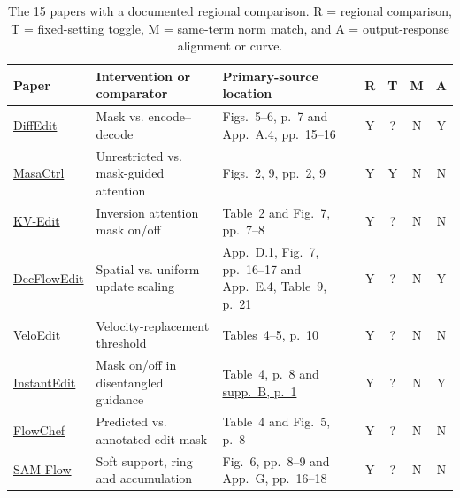 \begin{table}[t]\centering\small
\caption{The 15 papers with a documented regional comparison. R = regional comparison, T = fixed-setting toggle, M = same-term norm match, and A = output-response alignment or curve.}
{\setlength{\tabcolsep}{3pt}\begin{tabularx}{\textwidth}{@{}p{}X p{}cccc@{}}\toprule
Paper & Intervention or comparator & Primary-source location & R & T & M & A\\\midrule
\href{https://openreview.net/pdf?id=3lge0p5o-M-}{DiffEdit} & Mask vs. encode--decode & Figs.~5--6, p.~7 and App.~A.4, pp.~15--16 & Y & ? & N & Y\\
\href{https://openaccess.thecvf.com/content/ICCV2023/papers/Cao_MasaCtrl_Tuning-Free_Mutual_Self-Attention_Control_for_Consistent_Image_Synthesis_and_ICCV_2023_paper.pdf}{MasaCtrl} & Unrestricted vs. mask-guided attention & Figs.~2, 9, pp.~2, 9 & Y & Y & N & N\\
\href{https://openaccess.thecvf.com/content/ICCV2025/papers/Zhu_KV-Edit_Training-Free_Image_Editing_for_Precise_Background_Preservation_ICCV_2025_paper.pdf}{KV-Edit} & Inversion attention mask on/off & Table~2 and Fig.~7, pp.~7--8 & Y & ? & N & N\\
\href{https://arxiv.org/pdf/2609.34237v1}{DecFlowEdit} & Spatial vs. uniform update scaling & App.~D.1, Fig.~7, pp.~16--17 and App.~E.4, Table~9, p.~21 & Y & ? & N & Y\\
\href{https://arxiv.org/pdf/2603.13388v1}{VeloEdit} & Velocity-replacement threshold & Tables~4--5, p.~10 & Y & ? & N & N\\
\href{https://openaccess.thecvf.com/content/ICCV2025/papers/Gong_InstantEdit_Text-Guided_Few-Step_Image_Editing_with_Piecewise_Rectified_Flow_ICCV_2025_paper.pdf}{InstantEdit} & Mask on/off in disentangled guidance & Table~4, p.~8 and \href{https://openaccess.thecvf.com/content/ICCV2025/supplemental/Gong_InstantEdit_Text-Guided_Few-Step_ICCV_2025_supplemental.pdf}{supp.\ B, p.~1} & Y & ? & N & Y\\
\href{https://openaccess.thecvf.com/content/ICCV2025/papers/Patel_FlowChef_Steering_of_Rectified_Flow_Models_for_Controlled_Generations_ICCV_2025_paper.pdf}{FlowChef} & Predicted vs. annotated edit mask & Table~4 and Fig.~5, p.~8 & Y & ? & N & N\\
\href{https://arxiv.org/pdf/2606.06228v1}{SAM-Flow} & Soft support, ring and accumulation & Fig.~6, pp.~8--9 and App.~G, pp.~16--18 & Y & ? & N & N\\

\end{tabularx}}
\end{table}
